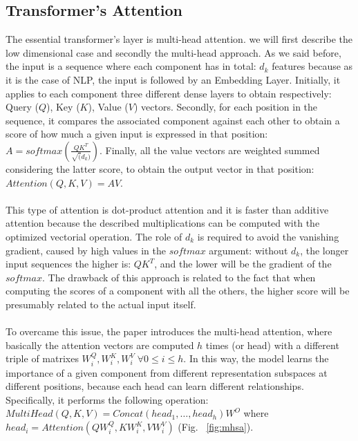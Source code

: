 \documentclass[LaM,binding=0.6cm]{sapthesis}
\begin{document}
\subsection{Transformer's Attention}
The essential transformer's layer is multi-head attention. we will first describe the low dimensional case and secondly the multi-head approach. As we said before, the input is a sequence where each component has in total: $d_k$ features because as it is the case of NLP, the input is followed by an Embedding Layer. Initially, it applies to each component three different dense layers to obtain respectively: Query ($Q$), Key ($K$), Value ($V$) vectors. Secondly, for each position in the sequence, it compares the associated component against each other to obtain a score of how much a given input is expressed in that position: $A = softmax\left(\frac{QK^T}{\sqrt(d_k)}\right)$. Finally, all the value vectors are weighted summed considering the latter score, to obtain the output vector in that position: $Attention(Q, K, V) = AV$.\\\\This type of attention is dot-product attention and it is faster than additive attention because the described multiplications can be computed with the optimized vectorial operation. The role of $d_k$ is required to avoid the vanishing gradient, caused by high values in the $softmax$ argument: without $d_k$, the longer input sequences the higher is: $QK^T$, and the lower will be the gradient of the $softmax$. The drawback of this approach is related to the fact that when computing the scores of a component with all the others, the higher score will be presumably related to the actual input itself.\\\\To overcame this issue, the paper introduces the multi-head attention, where basically the attention vectors are computed $h$ times (or head) with a different triple of matrixes $W^{Q}_{i}, W^{K}_{i}, W^{V}_{i} \; \forall 0\leq i\le h$. In this way, the model learns the importance of a given component from different representation subspaces at different positions, because each head can learn different relationships. Specifically, it performs the following operation: $MultiHead(Q,K,V)=Concat\left(head_1,\dots,head_h\right)W^O$ where $head_i= Attention\left(QW_{i}^{Q} , KW_{i}^{K} , VW_{i}^{V} \right)$ (Fig. ~\ref{fig:mhsa}).
\end{document}
